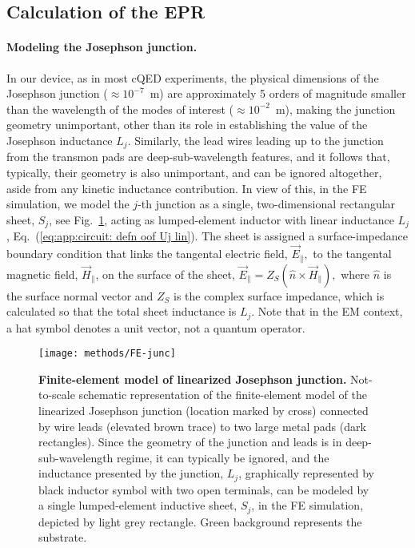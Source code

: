 \subsection{Calculation of the EPR \label{subsec:Calculation-of-EPR}}

\paragraph{Modeling the Josephson junction. }

In our device, as in most cQED experiments, the physical dimensions
of the Josephson junction ($\approx10^{-7}$~m) are approximately
5 orders of magnitude smaller than the wavelength of the modes of
interest ($\approx10^{-2}$~m), making the junction geometry unimportant,
other than its role in establishing the value of the Josephson inductance
$L_{j}$. Similarly, the lead wires leading up to the junction from
the transmon pads are deep-sub-wavelength features, and it follows
that, typically, their geometry is also unimportant, and can be ignored
altogether, aside from any kinetic inductance contribution. In view
of this, in the FE simulation, we model the $j$-th junction as a
single, two-dimensional rectangular sheet, $S_{j}$, see Fig.~\ref{fig:Appdx:JJ-FE-model},
acting as lumped-element inductor with linear inductance $L_{j}$,
Eq.~(\ref{eq:app:circuit: defn oof Uj lin}). The sheet is assigned
a surface-impedance boundary condition that links the tangental electric
field, $\vec{E}_{\parallel},$ to the tangental magnetic field, $\vec{H}_{\parallel}$,
on the surface of the sheet, $\vec{E}_{\parallel}=Z_{S}(\hat{n}\times\vec{H}_{\parallel}),$
where $\hat{n}$ is the surface normal vector and $Z_{S}$ is the
complex surface impedance, which is calculated so that the total sheet
inductance is $L_{j}$. Note that in the EM context, a hat symbol
denotes a unit vector, not a quantum operator.

\begin{figure}[th]
\centering{}\texttt{[image: methods/FE-junc]} \caption[Finite-element model of linearized Josephson junction]{\textbf{Finite-element model of linearized Josephson junction.}\label{fig:Appdx:JJ-FE-model}
Not-to-scale schematic representation of the finite-element model
of the linearized Josephson junction (location marked by cross) connected
by wire leads (elevated brown trace) to two large metal pads (dark
rectangles). Since the geometry of the junction and leads is in deep-sub-wavelength
regime, it can typically be ignored, and the inductance presented
by the junction, $L_{j}$, graphically represented by black inductor
symbol with two open terminals, can be modeled by a single lumped-element
inductive sheet, $S_{j}$, in the FE simulation, depicted by light
grey rectangle. Green background represents the substrate.}
\end{figure}

